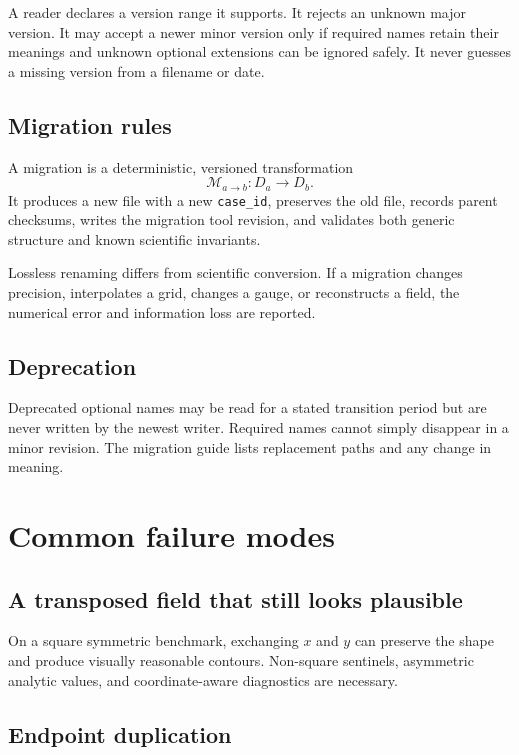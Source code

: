 \documentclass[11pt]{article}
\newcommand{\code}[1]{\texttt{#1}}
\begin{document}
A reader declares a version range it supports. It rejects an unknown major version. It may accept a newer minor version only if required names retain their meanings and unknown optional extensions can be ignored safely. It never guesses a missing version from a filename or date.

\subsection{Migration rules}

A migration is a deterministic, versioned transformation
\begin{equation}
\mathcal M_{a\rightarrow b}:D_a\longrightarrow D_b.
\end{equation}
It produces a new file with a new \code{case\_id}, preserves the old file, records parent checksums, writes the migration tool revision, and validates both generic structure and known scientific invariants.

Lossless renaming differs from scientific conversion. If a migration changes precision, interpolates a grid, changes a gauge, or reconstructs a field, the numerical error and information loss are reported.

\subsection{Deprecation}

Deprecated optional names may be read for a stated transition period but are never written by the newest writer. Required names cannot simply disappear in a minor revision. The migration guide lists replacement paths and any change in meaning.

\section{Common failure modes}
\label{sec:failures}

\subsection{A transposed field that still looks plausible}

On a square symmetric benchmark, exchanging $x$ and $y$ can preserve the shape and produce visually reasonable contours. Non-square sentinels, asymmetric analytic values, and coordinate-aware diagnostics are necessary.

\subsection{Endpoint duplication}
\end{document}
